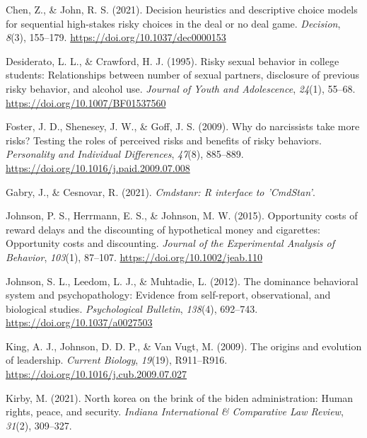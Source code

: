 \documentclass[
  donotrepeattitle,doc, 12pt, a4paper,floatsintext]{apa7}
\newlength{\cslhangindent}
\newlength{\cslentryspacingunit} %
\newenvironment{CSLReferences}[2] %
 {%
  \setlength{\parindent}{0pt}
  \ifodd #1
  \let\oldpar\par
  \def\par{\hangindent=\cslhangindent\oldpar}
  \fi
  \setlength{\parskip}{#2\cslentryspacingunit}
 }%
 {}
\begin{document}
\begin{CSLReferences}{1}{0}
\leavevmode{}%
Chen, Z., \& John, R. S. (2021). Decision heuristics and descriptive choice models for sequential high-stakes risky choices in the deal or no deal game. \emph{Decision}, \emph{8}(3), 155--179. \url{https://doi.org/10.1037/dec0000153}

\leavevmode{}%
Desiderato, L. L., \& Crawford, H. J. (1995). Risky sexual behavior in college students: Relationships between number of sexual partners, disclosure of previous risky behavior, and alcohol use. \emph{Journal of Youth and Adolescence}, \emph{24}(1), 55--68. \url{https://doi.org/10.1007/BF01537560}

\leavevmode{}%
Foster, J. D., Shenesey, J. W., \& Goff, J. S. (2009). Why do narcissists take more risks? {Testing} the roles of perceived risks and benefits of risky behaviors. \emph{Personality and Individual Differences}, \emph{47}(8), 885--889. \url{https://doi.org/10.1016/j.paid.2009.07.008}

\leavevmode{}%
Gabry, J., \& Cesnovar, R. (2021). \emph{Cmdstanr: {R} interface to '{CmdStan}'}.

\leavevmode{}%
Johnson, P. S., Herrmann, E. S., \& Johnson, M. W. (2015). Opportunity costs of reward delays and the discounting of hypothetical money and cigarettes: Opportunity costs and discounting. \emph{Journal of the Experimental Analysis of Behavior}, \emph{103}(1), 87--107. \url{https://doi.org/10.1002/jeab.110}

\leavevmode{}%
Johnson, S. L., Leedom, L. J., \& Muhtadie, L. (2012). The dominance behavioral system and psychopathology: Evidence from self-report, observational, and biological studies. \emph{Psychological Bulletin}, \emph{138}(4), 692--743. \url{https://doi.org/10.1037/a0027503}

\leavevmode{}%
King, A. J., Johnson, D. D. P., \& Van Vugt, M. (2009). The origins and evolution of leadership. \emph{Current Biology}, \emph{19}(19), R911--R916. \url{https://doi.org/10.1016/j.cub.2009.07.027}

\leavevmode{}%
Kirby, M. (2021). North korea on the brink of the biden administration: Human rights, peace, and security. \emph{Indiana International \& Comparative Law Review}, \emph{31}(2), 309--327.


\end{CSLReferences}
\end{document}

